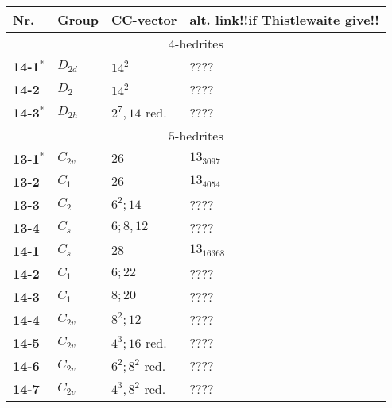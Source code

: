 \documentclass[12pt]{article}
\begin{document}
\begin{table}
\begin{center}
{\scriptsize
\begin{minipage}{7cm}
\begin{tabular}{||l|l|l|l||}
\hline\hline
Nr.     &Group    &CC-vector      &alt. link!!if Thistlewaite give!!\\\hline\hline
\multicolumn{4}{||c||}{$4$-hedrites}\\\hline
{\bf 14-1${}^*$}&$D_{2d}$       &$14^2$         &????\\
{\bf 14-2}      &$D_2$  &$14^2$         &????\\ 
{\bf 14-3${}^*$}&$D_{2h}$       &$2^7, 14$ red.  &????\\\hline\hline
\multicolumn{4}{||c||}{$5$-hedrites}\\\hline
{\bf 13-1${}^*$}&$C_{2v}$       &$26$           &$13_{3097}$\\
{\bf 13-2}      &$C_1$  &$26$           &$13_{4054}$\\
{\bf 13-3}      &$C_2$  &$6^2; 14$      &????\\
{\bf 13-4}      &$C_s$  &$6; 8, 12$     &????\\\hline
{\bf 14-1}      &$C_s$  &$28$           &$13_{16368}$\\
{\bf 14-2}      &$C_1$  &$6; 22$                &????\\
{\bf 14-3}      &$C_1$  &$8; 20$                &????\\
{\bf 14-4}      &$C_{2v}$       &$8^2; 12$      &????\\
{\bf 14-5}      &$C_{2v}$       &$4^3; 16$ red. &????\\
{\bf 14-6}      &$C_{2v}$       &$6^2; 8^2$ red.        &????\\
{\bf 14-7}      &$C_{2v}$       &$4^3, 8^2$ red.        &????\\\hline

\end{tabular}
\end{minipage}}
\end{center}
\end{table}
\end{document}
